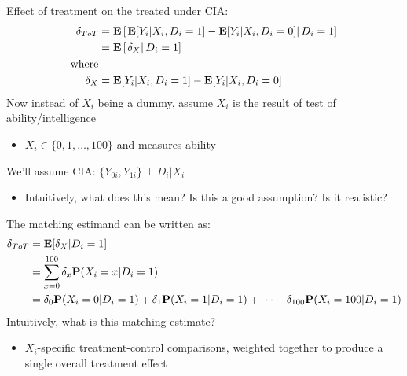 \documentclass[compress, 8pt]{beamer}
\begin{document}
\begin{frame}{}

Effect of treatment on the treated under CIA: 
\begin{align*}
    \delta_{ToT} &= \mathbf{E} \left[ \left.
            {\mathbf{E} [Y_{i} \vert X_i, D_i=1]}
            - {\mathbf{E} [Y_{i} \vert X_i, D_i=0]}        
            \right\vert D_i = 1
        \right] \\
        &= \mathbf{E} \left[ \left. 
            \delta_X
        \right\vert D_i = 1\right] \\
    \text{where} & \\
        \delta_X &= {\mathbf{E} [Y_{i} \vert X_i, D_i=1]}
            - {\mathbf{E} [Y_{i} \vert X_i, D_i=0]}
\end{align*}
Now instead of $X_i$ being a dummy, assume $X_i$ is the result of test of ability/intelligence
\begin{itemize}
    \item $X_i \in \{0, 1, \dots, 100\}$ and measures ability
\end{itemize}
We'll assume CIA: $\{Y_{0i}, Y_{1i}\} \perp D_i \vert X_i$ 
\begin{itemize}
    \item Intuitively, what does this mean? Is this a good assumption? Is it realistic?
\end{itemize}
The matching estimand can be written as:
\begin{align*}
    \delta_{ToT} %
    &= \EE [\delta_X \vert D_i = 1] \\
    &= \sum_{x=0}^{100} \delta_x \PP(X_i = x \vert D_i = 1 ) \\
    &= \delta_0 \PP (X_i = 0 \vert D_i = 1)
    + \delta_1 \PP (X_i = 1 \vert D_i = 1)
    + \dots + \delta_{100} \PP (X_i = 100 \vert D_i = 1)
\end{align*}
Intuitively, what is this matching estimate?
\begin{itemize}
    \item $X_i$-specific treatment-control comparisons, weighted together to produce a single overall treatment effect
\end{itemize}

\end{frame}
\end{document}
